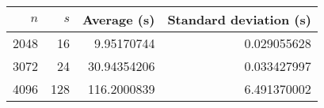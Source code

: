\begin{tabular}{rrrr}
$n$ & $s$ & Average (s) & Standard deviation (s)\\\hline
2048 & 16 & 9.95170744 & 0.029055628\\
3072 & 24 & 30.94354206 & 0.033427997\\
4096 & 128 & 116.2000839 & 6.491370002\\
\end{tabular}

